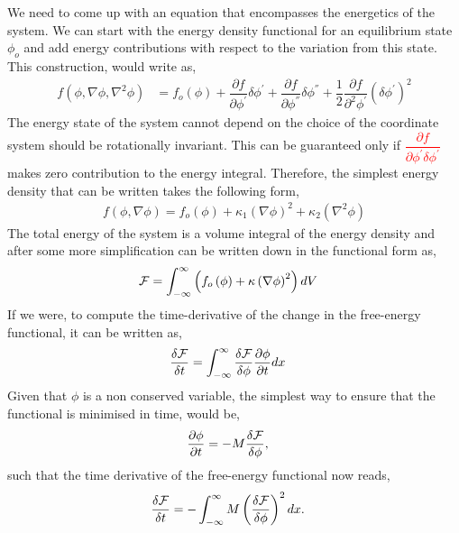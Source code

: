 \documentclass[12pt,a4paper]{report}
\begin{document}
We need to come up with an equation that encompasses the energetics of the system. 
We can start with the energy density functional for an equilibrium state $\phi_o$ and 
add energy contributions with respect to the variation from this state. This construction, 
would write as,\\
\begin{align}
	f\left(\phi,\nabla\phi,\nabla^2\phi\right) &= 
	f_o\left(\phi\right) + \dfrac{\partial f}{\partial \phi^{'}}\delta\phi^{'} 
	+ \dfrac{\partial f}{\partial \phi^{''}}\delta\phi^{''} + \dfrac{1}{2}
	\dfrac{\partial f}{\partial^2 \phi^{'}}\left(\delta\phi^{'}\right)^2
\end{align}
The energy state of the system cannot depend on the choice of the coordinate system should be rotationally invariant. This can be guaranteed only if 
\textcolor{red}{$\dfrac{\partial f}{\partial \phi^{'}\delta \phi^{'}}$} makes zero contribution to the energy integral. 
Therefore, the simplest energy density that can be written takes the following form,
\begin{align}
f\left(\phi,\nabla \phi\right)= 
f_o\left(\phi\right) + \kappa_1\left(\nabla \phi\right)^{2} + \kappa_2\left(\nabla^2 \phi\right) 
\end{align}
The total energy of the system is a volume integral of the energy density and after some more simplification 
can be written down in the functional form as,
\begin{align}
 {\cal F} &= \int_{-\infty}^{\infty}\left(f_o\left(\phi\right) + \kappa\left(\nabla \phi\right)^{2}\right) dV
\end{align}
If we were, to compute the time-derivative of the change in the free-energy functional, 
it can be written as, 
\begin{align}
 \dfrac{\delta {\cal F}}{\delta t} &= \int_{-\infty}^{\infty} \dfrac{\delta {\cal F}}{\delta \phi}\dfrac{\partial \phi}{\partial t}dx
 \label{time_derivative_free_energy}
\end{align}
Given that $\phi$ is a non conserved variable, the simplest way to ensure that the functional is minimised in time, would be,
\begin{align}
 \dfrac{\partial \phi}{\partial t} &= -M \dfrac{\delta {\cal F}}{\delta \phi},
\end{align}
such that the time derivative of the free-energy functional now reads, 
\begin{align}
 \dfrac{\delta {\cal F}}{\delta t} &= -\int_{-\infty}^{\infty}M\left(\dfrac{\delta {\cal F}}{\delta \phi}\right)^{2}dx.
\end{align}
\end{document}
